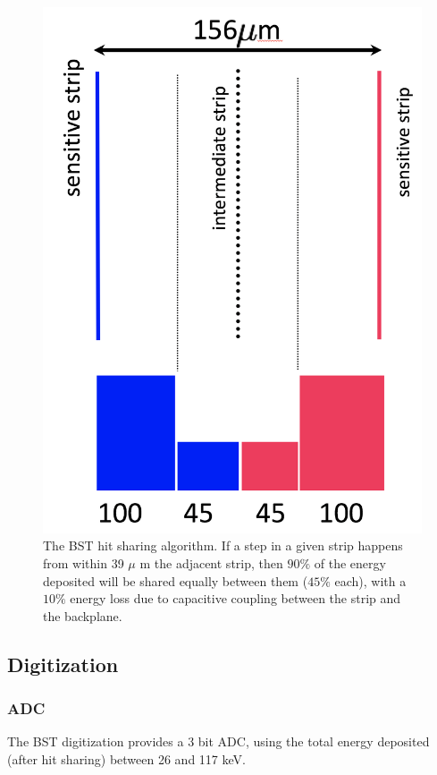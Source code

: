 \begin{figure}[t]
	\centering
	\includegraphics[width=0.95\columnwidth,keepaspectratio]{img/bstHitSharing.png}
	\caption{The BST hit sharing algorithm. If a step in a given strip happens from within 39 $\mu$ m the adjacent strip, then
            $90\%$ of the energy deposited will be shared equally between them ($45\%$ each), with a $10\%$ energy loss due
	         to capacitive coupling between the strip and the backplane.}
	\label{fig:bstHitSharing}
\end{figure}


\subsection{Digitization}

\subsubsection{ADC}
The BST digitization provides a 3 bit ADC, using the total energy deposited (after hit sharing) between 26 and 117 keV.

